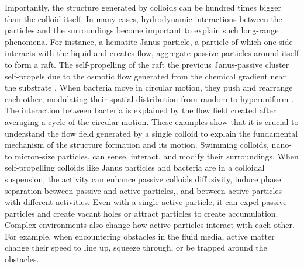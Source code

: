 \documentclass[12pt]{article}
\begin{document}
Importantly, the structure generated by colloids can be hundred times bigger than the colloid itself. In many cases, hydrodynamic interactions between the particles and the surroundings become important to explain such long-range phenomena. For instance, a hematite Janus particle, a particle of which one side interacts with the liquid and creates flow, aggregate passive particles around itself to form a raft. 
The self-propelling of the raft 
the previous Janus-passive cluster self-propels due to the osmotic flow generated from the chemical gradient near the substrate \cite{boniface_hydrodynamics_2023}.
When bacteria move in circular motion, they push and rearrange each other, modulating their spatial distribution from random to hyperuniform \cite{huang_circular_2021}. The interaction between bacteria is explained by the flow field created after averaging a cycle of the circular motion. 
These examples show that it is crucial to understand the flow field generated by a single colloid to explain the fundamental mechanism of the structure formation and its motion.
\fi
\iffalse
Swimming colloids, nano- to micron-size particles, can sense, interact, and modify their surroundings. When self-propelling colloids like Janus particles and bacteria are in a colloidal suspension, the activity can enhance passive colloids diffusivity,\cite{mino_enhanced_2011, jepson_enhanced_2013} induce phase separation between passive and active particles,\cite{mccandlish_spontaneous_2012, cates_motility-induced_2015, stenhammar_activity-induced_2015, wysocki_propagating_2016, smrek_small_2017, dolai_phase_2018}, and between active particles with different activities.\cite{weber_binary_2016, kumari_demixing_2017} Even with a single active particle, it can expel passive particles and create vacant holes or attract particles to create accumulation.\cite{katuri_inferring_2021, singh_interaction_2022}
%
Complex environments also change how active particles interact with each other.\cite{bechinger_active_2016} For example, when encountering obstacles in the fluid media, active matter change their speed to line up, squeeze through, or be trapped around the obstacles.\cite{di_leonardo_bacterial_2010, tanaka_hot_2017, bhattacharjee_bacterial_2019, kamdar_colloidal_2022} 
\end{document}
